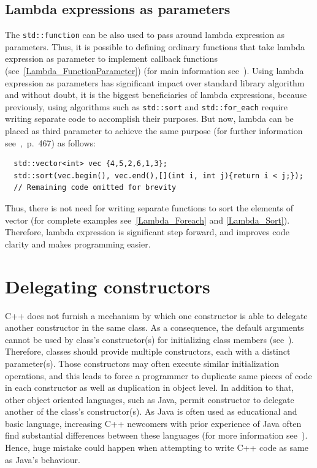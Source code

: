 \documentclass[11pt]{report}
\begin{document}
\subsection{Lambda expressions as parameters}
\label{subsection: Lambda Expressions as Parameters}
The \texttt{std::function} can be also used to pass around lambda expression as parameters. Thus, it is possible to defining ordinary functions that take lambda expression as parameter to implement callback functions (see~\ref{Lambda_FunctionParameter}) (for main information see~\cite{Allain:2011:FutureCpp}). Using lambda expression as parameters has significant impact over standard library algorithm and without doubt, it is the biggest beneficiaries of lambda expressions, because previously, using algorithms such as \texttt{std::sort} and \texttt{std::for\_each} require writing separate code to accomplish their purposes. But now, lambda can be placed as third parameter to achieve the same purpose (for further information see~\cite{Gregorie:professionalcpp},~p.~467) as follows:
\begin{lstlisting}
  std::vector<int> vec {4,5,2,6,1,3};
  std::sort(vec.begin(), vec.end(),[](int i, int j){return i < j;});
  // Remaining code omitted for brevity
\end{lstlisting}
Thus, there is not need for writing separate functions to sort the elements of vector (for complete examples see~\ref{Lambda_Foreach} and \ref{Lambda_Sort}). Therefore, lambda expression is significant step forward, and improves code clarity and makes programming easier.

\section{Delegating constructors}
\label{section: Delegating constructors}
C++ does not furnish a mechanism by which one constructor is able to delegate another constructor in the same class.  As a consequence, the default arguments cannot be used by class's constructor(s) for initializing class members (see~\cite{Stroustrup:2012:Cpp11}). Therefore, classes should provide multiple constructors, each with a distinct parameter(s). Those constructors may often execute similar initialization operations, and this leads to force a programmer to duplicate same pieces of code in each constructor as well as duplication in object level. In addition to that, other object oriented languages, such as Java, permit constructor to delegate another of the class's constructor(s). As Java is often used as educational and basic language, increasing C++ newcomers with prior experience of Java often find substantial differences between these languages (for more information see~\cite{Stroustrup:2012:Cpp11}). Hence, huge mistake could happen when attempting to write C++ code as same as Java's behaviour.
\end{document}
